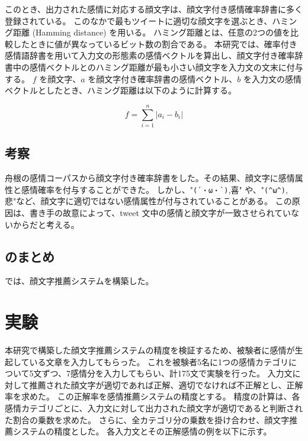 \documentclass[11pt,a4j]{jsarticle}
\begin{document}
このとき、出力された感情に対応する顔文字は、顔文字付き感情確率辞書に多く登録されている。
このなかで最もツイートに適切な顔文字を選ぶとき、ハミング距離 (Hamming distance) を用いる。
ハミング距離とは、任意の2つの値を比較したときに値が異なっているビット数の割合である。
本研究では、確率付き感情語辞書を用いて入力文の形態素の感情ベクトルを算出し、顔文字付き確率辞書中の感情ベクトルとのハミング距離が最も小さい顔文字を入力文の文末に付与する。
$f$ を顔文字、$a$ を顔文字付き確率辞書の感情ベクトル、$b$ を入力文の感情ベクトルとしたとき、ハミング距離は以下のように計算する。

\[
  f=\sum_{i=1}^{n} |a_i-b_i|
\]

  \subsection{考察}
舟根の感情コーパスから顔文字付き確率辞書をした。その結果、顔文字に感情属性と感情確率を付与することができた。
しかし、"\verb|(´・ω・`)|,喜" や、"\verb|(^ω^)|,悲"など、顔文字に適切ではない感情属性が付与されていることがある。
この原因は、書き手の故意によって、tweet 文中の感情と顔文字が一致させられていないからだと考える。

  \subsection{ のまとめ}
では、顔文字推薦システムを構築した。

\section{実験}\label{sec:experiment}
本研究で構築した顔文字推薦システムの精度を検証するため、被験者に感情が生起している文章を入力してもらった。
これを被験者5名に1つの感情カテゴリについて5文ずつ、7感情分を入力してもらい、計175文で実験を行った。
入力文に対して推薦された顔文字が適切であれば正解、適切でなければ不正解とし、正解率を求めた。
この正解率を感情推薦システムの精度とする。
精度の計算は、各感情カテゴリごとに、入力文に対して出力された顔文字が適切であると判断された割合の乗数を求めた。
さらに、全カテゴリ分の乗数を掛け合わせ、顔文字推薦システムの精度とした。
各入力文とその正解感情の例を以下に示す。
\end{document}
